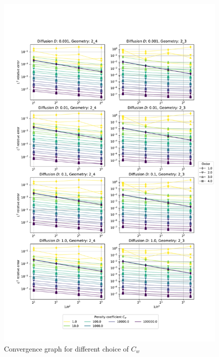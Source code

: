 \begin{figure}[p!]
	\centering
	\includegraphics[height=\textheight]{../figs/parametric/diffusion_2D/laplace}
		
	\caption{ Convergence graph for different choice of $C_w$}
	\label{fig:conv_laplace}
\end{figure}